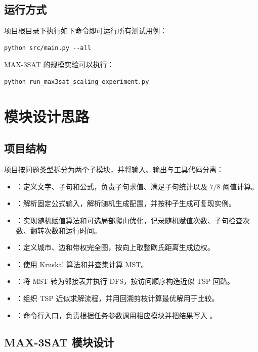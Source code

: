\documentclass{sysucseexp}
\begin{document}
\subsection{运行方式}

项目根目录下执行如下命令即可运行所有测试用例：

{\small
\begin{verbatim}
python src/main.py --all
\end{verbatim}
}

MAX-3SAT 的规模实验可以执行：

{\small
\begin{verbatim}
python run_max3sat_scaling_experiment.py
\end{verbatim}
}

\section{模块设计思路}

\subsection{项目结构}

项目按问题类型拆分为两个子模块，并将输入、输出与工具代码分离：

\begin{itemize}
  \item {}：定义文字、子句和公式，负责子句求值、满足子句统计以及 $7/8$ 阈值计算。
  \item {}：解析固定公式输入，解析随机生成配置，并按种子生成可复现实例。
  \item {}：实现随机赋值算法和可选局部爬山优化，记录随机赋值次数、子句检查次数、翻转次数和运行时间。
  \item {}：定义城市、边和带权完全图，按向上取整欧氏距离生成边权。
  \item {}：使用 Kruskal 算法和并查集计算 MST。
  \item {}：将 MST 转为邻接表并执行 DFS，按访问顺序构造近似 TSP 回路。
  \item {}：组织 TSP 近似求解流程，并用回溯剪枝计算最优解用于比较。
  \item {}：命令行入口，负责根据任务参数调用相应模块并把结果写入 。
\end{itemize}

\subsection{MAX-3SAT 模块设计}
\end{document}
